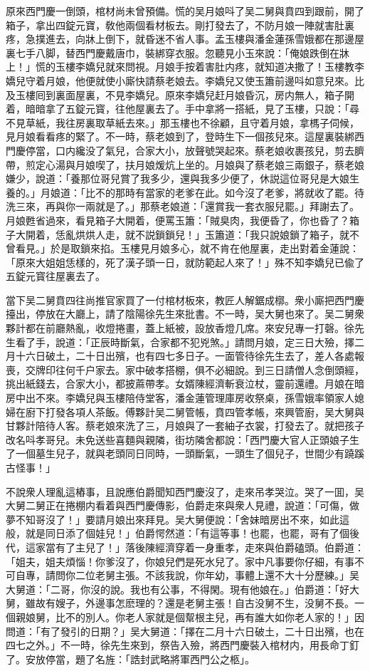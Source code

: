 原來西門慶一倒頭，棺材尚未曾預備。慌的吴月娘呌了吴二舅與賁四到跟前，開了箱子，拿出四錠元寶，敎他兩個看材板去。剛打發去了，不防月娘一陣就害肚裏疼，急撲進去，向牀上倒下，就昏迷不省人事。孟玉樓與潘金蓮孫雪娥都在那邊屋裏七手八脚，替西門慶戴唐巾，裝綁穿衣服。忽聽見小玉來說：「俺娘跌倒在牀上！」慌的玉樓李嬌兒就來問視。月娘手按着害肚内疼，就知道决撒了！玉樓教李嬌兒守着月娘，他便就使小廝快請蔡老娘去。李嬌兒又使玉簫前邊呌如意兒來。比及玉樓囘到裏面屋裏，不見李嬌兒。原來李嬌兒赶月娘昏沉，房内無人，箱子開着，暗暗拿了五錠元寳，往他屋裏去了。手中拿將一搭紙，見了玉樓，只說：「尋不見草紙，我往房裏取草紙去來。」那玉樓也不徐顧，且守着月娘，拿榪子伺候，見月娘看看疼的緊了。不一時，蔡老娘到了，登時生下一個孩兒來。這屋裏裝綁西門慶停當，口内纔没了氣兒，合家大小，放聲號哭起來。蔡老娘收裹孩兒，剪去臍帶，煎定心湯與月娘喫了，扶月娘煖炕上坐的。月娘與了蔡老娘三兩銀子，蔡老娘嫌少，說道：「養那位哥兒賞了我多少，還與我多少便了，休説這位哥兒是大娘生養的。」月娘道：「比不的那時有當家的老爹在此。如今沒了老爹，將就收了罷。待洗三來，再與你一兩就是了。」那蔡老娘道：「還賞我一套衣服兒罷。」拜謝去了。月娘甦省過來，看見箱子大開着，便罵玉簫：「賊臭肉，我便昏了，你也昏了？箱子大開着，恁亂烘烘人走，就不説鎖鎖兒！」玉簫道：「我只說娘鎖了箱子，就不曾看見。」於是取鎖來掐。玉樓見月娘多心，就不肯在他屋裏，走出對着金蓮說：「原來大姐姐恁樣的，死了漢子頭一日，就防範起人來了！」殊不知李嬌兒已偸了五錠元寳往屋裏去了。

當下吴二舅賁四往尚推官家買了一付棺材板來，教匠人解鋸成槨。衆小廝把西門慶擡出，停放在大廳上，請了陰陽徐先生來批書。不一時，吴大舅也來了。吴二舅衆夥計都在前廳熱亂，收燈捲畫，蓋上紙被，設放香燈几席。來安兒專一打磬。徐先生看了手，說道：「正辰時斷氣，合家都不犯兇煞。」請問月娘，定三日大殮，擇二月十六日破土，二十日出殯，也有四七多日子。一面管待徐先生去了，差人各處報喪，交牌印往何千户家去。家中破孝搭棚，俱不必細說。到三日請僧人念倒頭經，挑出紙錢去，合家大小，都披蔴帶孝。女婿陳經濟斬衰泣杖，靈前還禮。月娘在暗房中出不來。李嬌兒與玉樓陪侍堂客，潘金蓮管理庫房收祭桌，孫雪娥率領家人媳婦在廚下打發各項人茶飯。傅夥計吴二舅管帳，賁四管孝帳，來興管廚，吴大舅與甘夥計陪待人客。蔡老娘來洗了三，月娘與了一套紬子衣裳，打發去了。就把孩子改名呌孝哥兒。未免送些喜麵與親隣，街坊隣舍都說：「西門慶大官人正頭娘子生了一個墓生兒子，就與老頭同日同時，一頭斷氣，一頭生了個兒子，世間少有蹺蹊古怪事！」

不說衆人理亂這樁事，且說應伯爵聞知西門慶沒了，走來吊孝哭泣。哭了一囬，吴大舅二舅正在捲棚内看着與西門慶傳影，伯爵走來與衆人見禮，說道：「可傷，做夢不知哥沒了！」要請月娘出來拜見。吴大舅便說：「舍妹暗房出不來，如此這般，就是同日添了個娃兒！」伯爵愕然道：「有這等事！也罷，也罷，哥有了個後代，這家當有了主兒了！」落後陳經濟穿着一身重孝，走來與伯爵磕頭。伯爵道：「姐夫，姐夫煩惱！你爹沒了，你娘兒們是死水兒了。家中凡事要你仔細，有事不可自專，請問你二位老舅主張。不該我說，你年幼，事體上還不大十分歷練。」吴大舅道：「二哥，你沒的說。我也有公事，不得閑。現有他娘在。」伯爵道：「好大舅，雖故有嫂子，外邊事怎麽理的？還是老舅主張！自古没舅不生，没舅不長。一個親娘舅，比不的別人。你老人家就是個幚根主兒，再有誰大如你老人家的！」因問道：「有了發引的日期？」吴大舅道：「擇在二月十六日破土，二十日出殯，也在四七之外。」不一時，徐先生來到，祭告入殮，將西門慶裝入棺材内，用長命丁釘了。安放停當，題了名旌：「誥封武略將軍西門公之柩」。

